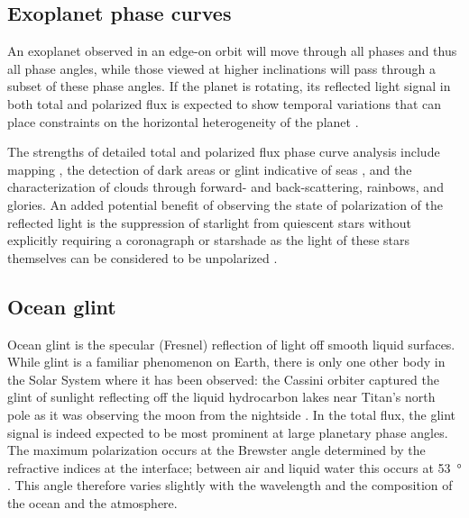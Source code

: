 \documentclass[
    usenatbib,
]{mnras}
\begin{document}
\subsection{Exoplanet phase curves}

An exoplanet observed in an edge-on orbit will move through all phases and thus all phase angles, while those viewed at higher inclinations will pass through a subset of these phase angles.
%
If the planet is rotating, its reflected light signal in both total and polarized flux is expected to show temporal variations that can place constraints on the horizontal heterogeneity of the planet \citep{2001Natur.412..885F,stam2008,2022A&A...664A..59M}.

The strengths of detailed total and polarized flux phase curve analysis include mapping \citep{2001Natur.412..885F, berdyugina2019surface, 2022A&A...664A..59M}, the detection of dark areas or glint indicative of seas \citep{groot2020, cowan2008inverting, lustig2019}, and the characterization of clouds through forward- and back-scattering, rainbows, and glories.
%
An added potential benefit of observing the state of polarization of the reflected light is the suppression of starlight from quiescent stars without explicitly requiring a coronagraph or starshade as the light of these stars themselves can be considered to be unpolarized \citep{kemp1987}.


\subsection{Ocean glint}

Ocean glint is the specular (Fresnel) reflection of light off smooth liquid surfaces. While glint is a familiar phenomenon on Earth, there is only
one other body in the Solar System where it has been observed: 
the Cassini orbiter captured the glint of sunlight reflecting off the
liquid hydrocarbon lakes near Titan's north pole as it was observing
the moon from the nightside \citep{2010GeoRL..37.7104S}.
%
In the total flux, the glint signal is indeed expected to be most prominent at large planetary phase angles.
%
The maximum polarization occurs at the Brewster angle determined by the refractive indices at the interface; between air and liquid water this occurs at \qty{53}{\degree} \citep[i.e., a phase angle of \qty{127}{\degree}; see, e.g.,][]{2008Icar..195..927W}.
%
This angle therefore varies slightly with the wavelength and the composition of the ocean and the atmosphere.
%
\end{document}
